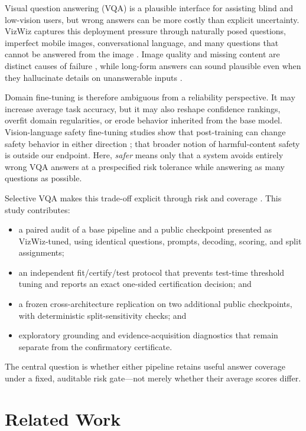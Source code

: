 \documentclass[11pt]{article}
\begin{document}
Visual question answering (VQA) is a plausible interface for assisting blind and
low-vision users, but wrong answers can be more costly than explicit uncertainty.
VizWiz captures this deployment pressure through naturally posed questions,
imperfect mobile images, conversational language, and many questions that cannot
be answered from the image \citep{Gurari_2018_CVPR}.  Image quality and missing
content are distinct causes of failure \citep{Chiu_2020_CVPR}, while long-form
answers can sound plausible even when they hallucinate details on unanswerable
inputs \citep{huh2024longform}.

Domain fine-tuning is therefore ambiguous from a reliability perspective.  It may
increase average task accuracy, but it may also reshape confidence rankings,
overfit domain regularities, or erode behavior inherited from the base model.
Vision-language safety fine-tuning studies show that post-training can change
safety behavior in either direction \citep{pmlr-v235-zong24a}; that broader notion
of harmful-content safety is outside our endpoint.  Here, \emph{safer} means only
that a system avoids entirely wrong VQA answers at a prespecified risk tolerance
while answering as many questions as possible.

Selective VQA makes this trade-off explicit through risk and coverage
\citep{whitehead2022reliablevqa,Dancette_2023_CVPR}.  This study contributes:
\begin{itemize}
  \item a paired audit of a base pipeline and a public checkpoint presented as
        VizWiz-tuned, using identical questions, prompts, decoding, scoring, and
        split assignments;
  \item an independent fit/certify/test protocol that prevents test-time threshold
        tuning and reports an exact one-sided certification decision; and
  \item a frozen cross-architecture replication on two additional public
        checkpoints, with deterministic split-sensitivity checks; and
  \item exploratory grounding and evidence-acquisition diagnostics that remain
        separate from the confirmatory certificate.
\end{itemize}

The central question is whether either pipeline retains useful answer coverage
under a fixed, auditable risk gate---not merely whether their average scores differ.

\section{Related Work}
\end{document}
